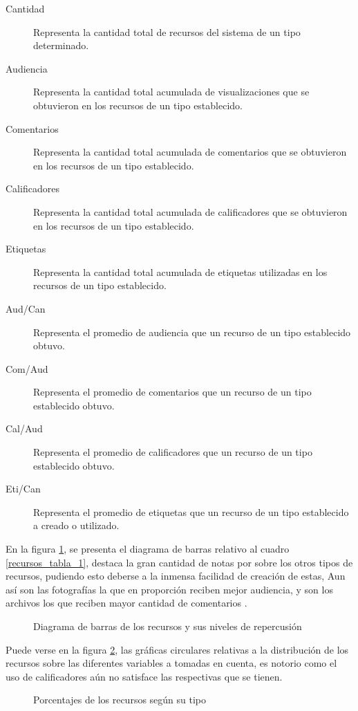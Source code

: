 \begin{description}
\item [Cantidad] Representa la cantidad total de recursos del sistema de un
tipo determinado.
\item [Audiencia] Representa la cantidad total acumulada de visualizaciones que
se obtuvieron en los recursos de un tipo establecido.
\item [Comentarios] Representa la cantidad total acumulada de comentarios que
se obtuvieron en los recursos de un tipo establecido.
\item [Calificadores] Representa la cantidad total acumulada de calificadores
que se obtuvieron en los recursos de un tipo establecido.
\item [Etiquetas] Representa la cantidad total acumulada de etiquetas utilizadas
en los recursos de un tipo establecido.
\item [Aud/Can] Representa el promedio de audiencia que un recurso de un tipo
establecido obtuvo.
\item [Com/Aud] Representa el promedio de comentarios que un recurso de un tipo
establecido obtuvo.
\item [Cal/Aud] Representa el promedio de calificadores que un recurso de un
tipo establecido obtuvo.
\item [Eti/Can] Representa el promedio de etiquetas que un recurso de un tipo
establecido a creado o utilizado.
\end{description}

En la figura \ref{recursos_bars_1}, se presenta el diagrama de barras relativo
al cuadro \ref{recursos_tabla_1}, destaca la gran cantidad de notas por sobre
los otros tipos de recursos, pudiendo esto deberse a la inmensa facilidad de
creación de estas, Aun así son las fotografías la que en proporción reciben
mejor audiencia, y son los archivos los que reciben mayor cantidad de 
comentarios
.
\begin{figure}
\centering

\caption{Diagrama de barras de los recursos y sus niveles de repercusión}
\label{recursos_bars_1}
\end{figure}

Puede verse en la figura \ref{recursos_pie_1}, las gráficas circulares relativas
a la distribución de los recursos sobre las diferentes variables a tomadas en
cuenta, es notorio como el uso de calificadores aún no satisface las respectivas
que se tienen.

\begin{figure}
\centering

\caption{Porcentajes de los recursos según su tipo}
\label{recursos_pie_1}
\end{figure}

